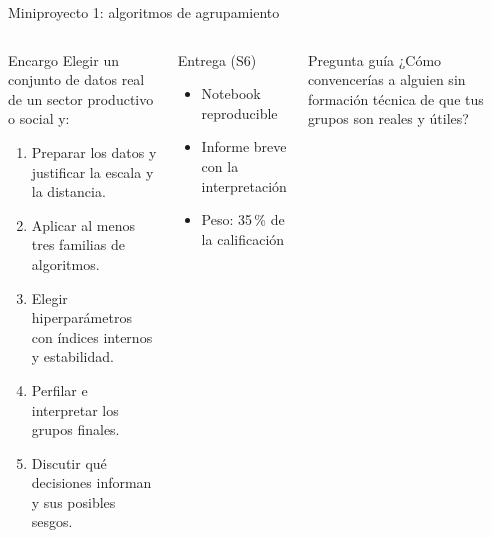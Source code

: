 \documentclass[aspectratio=169,11pt]{beamer}
\begin{document}
\begin{frame}{Miniproyecto 1: algoritmos de agrupamiento}
  \begin{columns}[T]
    \begin{block}{Encargo}
      Elegir un conjunto de datos real de un sector productivo o social y:
      \begin{enumerate}
        \item Preparar los datos y justificar la escala y la distancia.
        \item Aplicar al menos tres familias de algoritmos.
        \item Elegir hiperparámetros con índices internos y estabilidad.
        \item Perfilar e interpretar los grupos finales.
        \item Discutir qué decisiones informan y sus posibles sesgos.
      \end{enumerate}
    \end{block}
    \begin{exampleblock}{Entrega (S6)}
      \begin{itemize}
        \item Notebook reproducible
        \item Informe breve con la interpretación
        \item Peso: 35\,\% de la calificación
      \end{itemize}
    \end{exampleblock}
    \begin{alertblock}{Pregunta guía}
      ¿Cómo convencerías a alguien sin formación técnica de que tus grupos son reales y útiles?
    \end{alertblock}
  \end{columns}
\end{frame}
\end{document}
